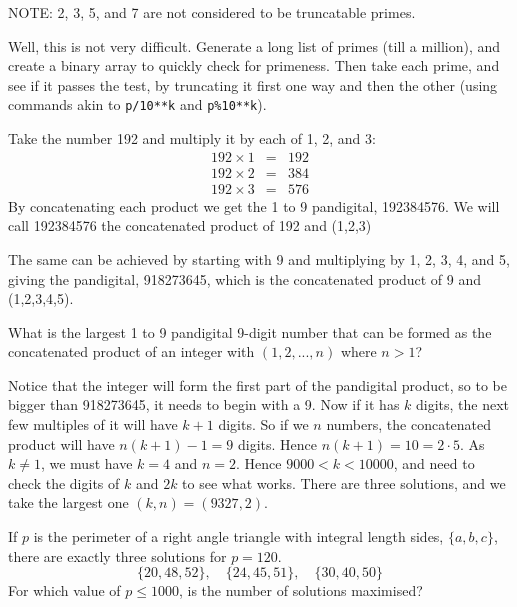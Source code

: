 \footnotesize
NOTE: 2, 3, 5, and 7 are not considered to be truncatable primes.
\normalsize

 Well, this is not very difficult.  Generate a long list of primes (till a million), and create a binary array
to quickly check for primeness.  Then take each prime, and see if it passes the test, by truncating it first one way and then the other (using commands akin to \verb"p/10**k" and \verb"p%10**k").




Take the number 192 and multiply it by each of 1, 2, and 3:
\begin{eqnarray*}
    192 \times 1 &= &192 \\
    192 \times 2 &= &384 \\
    192 \times 3 &= &576
\end{eqnarray*}
By concatenating each product we get the 1 to 9 pandigital, 192384576. We will call 192384576 the concatenated product of 192 and (1,2,3)

The same can be achieved by starting with 9 and multiplying by 1, 2, 3, 4, and 5, giving the pandigital, 918273645, which is the concatenated product of 9 and (1,2,3,4,5).

What is the largest 1 to 9 pandigital 9-digit number that can be formed as the concatenated product of an integer with $(1,2, ... , n)$ where $n > 1$?

Notice that the integer will form the first part of the pandigital product, so to be bigger than 918273645, it needs to begin with a 9.  Now if it has $k$ digits, the next few multiples of it will have $k+1$ digits.  So if we $n$ numbers, the concatenated product will have $n(k+1)-1 = 9$ digits.  Hence $n(k+1) = 10 = 2\cdot5$.  As $k \neq 1$, we must have $k = 4$ and $n = 2$.  Hence $9000 < k < 10000$, and need to check the digits of $k$ and $2k$ to see what works.  There are three solutions, and we take the largest one $(k,n) = (9327,2)$.




If $p$ is the perimeter of a right angle triangle with integral length sides, $\{a,b,c\}$, there are exactly three solutions for $p = 120$.
$$ \{20,48,52\}, \quad \{24,45,51\}, \quad \{30,40,50\}$$
For which value of $p \leq 1000$, is the number of solutions maximised?

